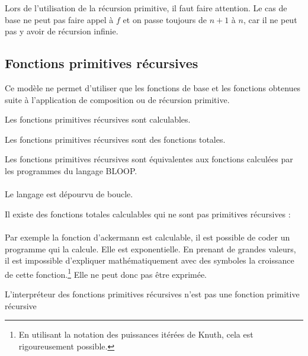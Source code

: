 \begin{myrem}
	Lors de l'utilisation de la récursion primitive, il faut faire
	attention. Le cas de base ne peut pas faire appel à $f$ et on passe
	toujours de $n+1$ à $n$, car il ne peut pas y avoir de récursion infinie.
\end{myrem}

\subsection{Fonctions primitives récursives}
Ce modèle ne permet d'utiliser que les fonctions de base et les fonctions
obtenues suite à l'application de composition ou de récursion primitive.

\begin{myprop}
	Les fonctions primitives récursives sont calculables.
\end{myprop}

\begin{myprop}
	Les fonctions primitives récursives sont des fonctions totales.
\end{myprop}

\begin{myprop}
	Les fonctions primitives récursives sont équivalentes aux fonctions calculées par les programmes du langage BLOOP.
\end{myprop}
\paragraph{} Le langage est dépourvu de boucle.

\begin{myprop}
	Il existe des fonctions totales calculables qui ne sont pas primitives récursives :
\end{myprop}
\paragraph{} Par exemple la fonction d’ackermann est calculable, il est possible de coder un programme qui la calcule. Elle est exponentielle. En prenant de grandes valeurs, il est impossible d’expliquer mathématiquement avec des symboles la croissance de cette fonction.\footnote{
En utilisant la notation des puissances itérées de Knuth, cela est rigoureusement possible.
}
Elle ne peut donc pas être exprimée.

\begin{myprop}
	L'interpréteur des fonctions primitives récursives n'est pas une fonction primitive récursive
\end{myprop}

